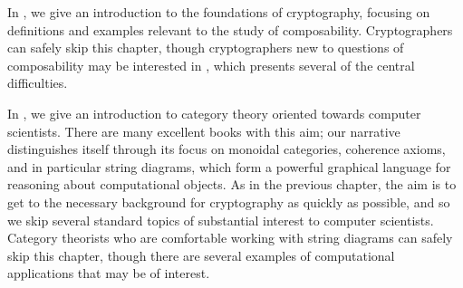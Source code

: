 In , we give an introduction
to the foundations of cryptography, focusing on definitions and examples
relevant to the study of composability. Cryptographers can safely skip this
chapter, though cryptographers new to questions of composability may be
interested in , which
presents several of the central difficulties.

In , we give an
introduction to category theory oriented towards computer scientists. There are
many excellent books with this aim; our narrative distinguishes itself through
its focus on monoidal categories, coherence axioms, and in particular string
diagrams, which form a powerful graphical language for reasoning about
computational objects. As in the previous chapter, the aim is to get to the
necessary background for cryptography as quickly as possible, and so we skip
several standard topics of substantial interest to computer scientists. Category
theorists who are comfortable working with string diagrams can safely skip this
chapter, though there are several examples of computational applications that
may be of interest.
